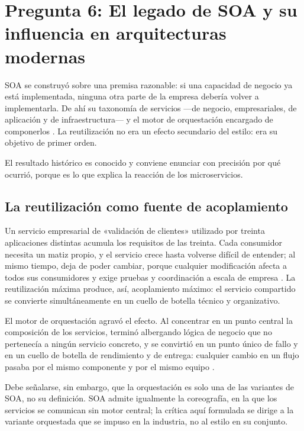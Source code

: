 \section[Pregunta 6: El legado de SOA]{Pregunta 6: El legado de SOA y su influencia en arquitecturas modernas}


SOA se construyó sobre una premisa razonable: si una capacidad de negocio ya está implementada, ninguna otra parte de la empresa debería volver a implementarla. De ahí su taxonomía de servicios ---de negocio, empresariales, de aplicación y de infraestructura--- y el motor de orquestación encargado de componerlos \parencite{richardsford2020}. La reutilización no era un efecto secundario del estilo: era su objetivo de primer orden.

El resultado histórico es conocido y conviene enunciar con precisión por qué ocurrió, porque es lo que explica la reacción de los microservicios.

\subsection{La reutilización como fuente de acoplamiento}

Un servicio empresarial de «validación de clientes» utilizado por treinta aplicaciones distintas acumula los requisitos de las treinta. Cada consumidor necesita un matiz propio, y el servicio crece hasta volverse difícil de entender; al mismo tiempo, deja de poder cambiar, porque cualquier modificación afecta a todos sus consumidores y exige pruebas y coordinación a escala de empresa \parencite{richardsford2020}. La reutilización máxima produce, así, acoplamiento máximo: el servicio compartido se convierte simultáneamente en un cuello de botella técnico y organizativo.

El motor de orquestación agravó el efecto. Al concentrar en un punto central la composición de los servicios, terminó albergando lógica de negocio que no pertenecía a ningún servicio concreto, y se convirtió en un punto único de fallo y en un cuello de botella de rendimiento y de entrega: cualquier cambio en un flujo pasaba por el mismo componente y por el mismo equipo \parencite{richardsford2020}.

Debe señalarse, sin embargo, que la orquestación es solo una de las variantes de SOA, no su definición. SOA admite igualmente la coreografía, en la que los servicios se comunican sin motor central; la crítica aquí formulada se dirige a la variante orquestada que se impuso en la industria, no al estilo en su conjunto.

